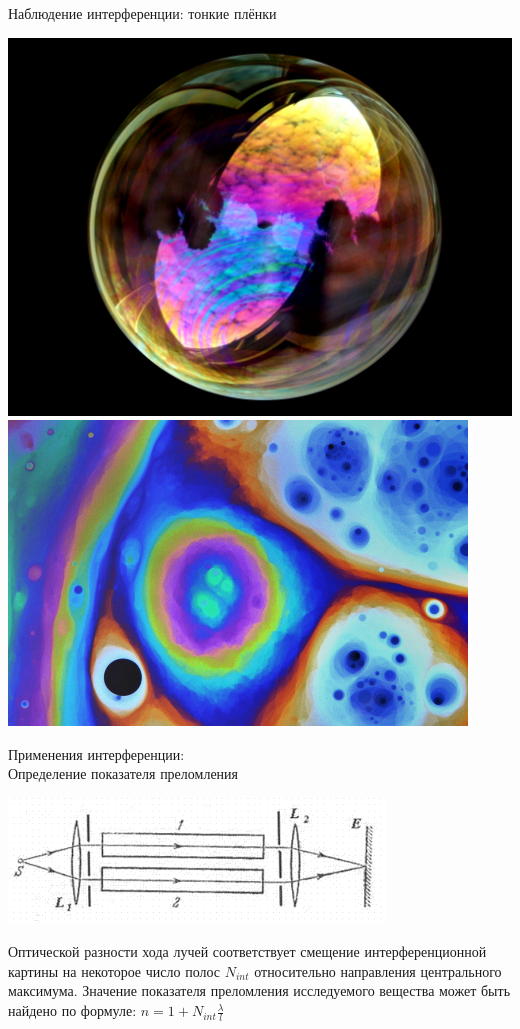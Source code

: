 \documentclass[usenames,dvipsnames,pdftex,unicode,hidelinks]{beamer}
\begin{document}
  \begin{frame}{Наблюдение интерференции: тонкие плёнки}
    \begin{center}
      \includegraphics[height=0.6\textheight]{bubble}
      \includegraphics[width=0.6\textheight,angle=90]{thin-film}
    \end{center}
  \end{frame}

  \begin{frame}{Применения интерференции:\\ Определение показателя преломления}
    \begin{center}
      \includegraphics[width=0.75\textwidth]{n}
    \end{center}
    \begin{block}{}
      Оптической разности хода лучей соответствует смещение
      интерференционной картины на некоторое число полос $N_{int}$ относительно направления
      центрального максимума. Значение показателя преломления исследуемого вещества может быть найдено по формуле:
      $
        n = 1 + N_{int} \frac{\lambda}{l}
      $
    \end{block}
  \end{frame}
\end{document}
